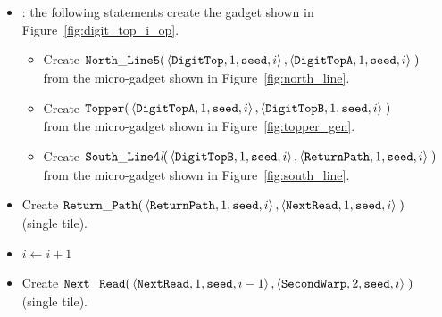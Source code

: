 \begin{itemize}
    \item {\dtop}: the following statements create the gadget shown in Figure~\ref{fig:digit_top_i_op}.
    \begin{itemize}
        \item Create
        $\begin{aligned}[t]
            {\tt North\_Line5}(& \left \langle {\tt DigitTop},  1, {\tt seed}, i \right\rangle,
                                 \left \langle {\tt DigitTopA}, 1, {\tt seed}, i \right\rangle \;)
        \end{aligned}$\\ from the micro-gadget shown in Figure~\ref{fig:north_line}.

        \item Create
        $\begin{aligned}[t]
            {\tt Topper}(& \left\langle {\tt DigitTopA}, 1, {\tt seed}, i \right\rangle,
                           \left\langle {\tt DigitTopB}, 1, {\tt seed}, i \right\rangle \;)
        \end{aligned}$\\ from the micro-gadget shown in Figure~\ref{fig:topper_gen}.

        \item Create
        $\begin{aligned}[t]
            {\tt South\_Line4\textit{l}}(& \left\langle {\tt DigitTopB},  1, {\tt seed}, i\right\rangle,
                                           \left\langle {\tt ReturnPath}, 1, {\tt seed}, i\right\rangle \;)
        \end{aligned}$\\ from the micro-gadget shown in Figure~\ref{fig:south_line}.
    \end{itemize}

    \item Create
    $\begin{aligned}[t]
            {\tt Return\_Path}(&\left\langle {\tt ReturnPath},    1, {\tt seed}, i \right\rangle,
                         \left\langle {\tt NextRead}, 1, {\tt seed}, i \right\rangle \;)
    \end{aligned}$\\ (single tile).

    \item $i \gets i + 1$

    \item Create
    $\begin{aligned}[t]
            {\tt Next\_Read}(&\left\langle {\tt NextRead},   1, {\tt seed}, i - 1\right\rangle,
                       \left\langle {\tt SecondWarp}, 2, {\tt seed}, i    \right\rangle \;)
    \end{aligned}$\\ (single tile).


\end{itemize}
